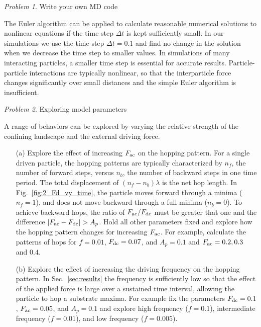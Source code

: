 \documentclass[preprint,showpacs,preprintnumbers,amsmath,amssymb,aps,prb]{revtex4-1}
\theoremstyle{remark}
\newtheorem{problem}{Problem}
\begin{document}
\begin{problem}{Write your own MD code}
\begin{enumerate}
  \end{enumerate}

  The Euler algorithm can be applied to
  calculate reasonable numerical solutions to 
  nonlinear
  equations if the time step $\Delta t$
  is kept sufficiently small.\cite{Newman}
  In our simulations we use the time step $\Delta t = 0.1$
  and find no change in the solution
  when we decrease the time step to smaller values.
  In simulations of
  many interacting particles,
  a smaller
  time step is essential for accurate results.
  Particle-particle interactions are typically nonlinear,
  so that the interparticle force changes significantly over small distances and the simple Euler algorithm is insufficient.
  
\end{problem}

\begin{problem}{Exploring model parameters}
\label{ex:parameters}

\noindent A range of  behaviors
can be explored by varying the
  relative strength of the confining landscape
  and the external driving force.

\begin{enumerate}

\item[(a)]
  Explore the effect of increasing $F_{\rm ac}$ on the hopping pattern.
  For a single driven particle,
  the hopping patterns are typically characterized
  by $n_f$, the number of forward steps,
  versus $n_b$, the number of backward steps  in one
  time period.
  The total displacement of $(n_f - n_b) \lambda$ 
  is the net hop length.  
  In Fig.~\ref{fig:2_Fd_vy_time},
  the particle moves forward through a minima ($n_f = 1$),
  and does not move backward through a full minima ($n_b = 0$).  
  To achieve
  backward hops,
  the  ratio of $F_{\rm ac}/F_{\rm dc}$ must be greater that one  
  and the difference $|F_{\rm ac} - F_{\rm dc}| > A_p$.
  Hold all other parameters fixed and %
  explore how the hopping pattern
  changes for increasing $F_{\rm ac}$.
  For example,
  calculate the patterns of hops for  
  $f=0.01$, $F_{\rm dc}=0.07$, and $A_p = 0.1$
  and
  $F_{\rm ac} = 0.2, 0.3$ and $0.4$.
  
\item[(b)] Explore the effect of increasing the driving frequency on the hopping pattern. In Sec.~\ref{sec:results}
  the frequency is sufficiently low so that the effect of 
  the applied force is large
  over a sustained time interval,
  allowing the particle to hop a substrate maxima.
  For example fix
  the parameters
  $F_{\rm dc}=0.1$, $F_{\rm ac}=0.05$, and $A_p = 0.1$
  and explore
  high frequency 
  ($f = 0.1$),
  intermediate frequency 
  ($f = 0.01$),
  and low frequency
  ($f = 0.005$).
 

\end{enumerate}
\end{problem}
\end{document}
